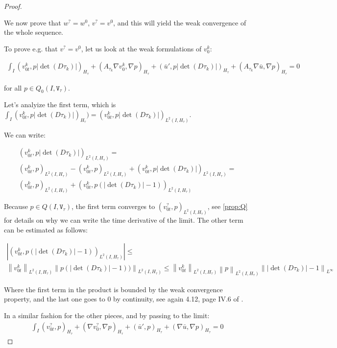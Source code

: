 \documentclass[english,a4paper,9pt,oneside]{scrbook}	%
\theoremstyle{break}
\newenvironment{mproof}[1][\proofname]{%
  \begin{proof}[#1]$ $\par\nobreak\ignorespaces
}{%
  \end{proof}
}
\renewcommand*{\proofname}{Proof}
\theoremstyle{remark}
\newcommand{\norm}[1]{\left\lVert#1\right\rVert}
\newcommand{\tw}[1]{\texttt{#1}}
\begin{document}
\begin{mproof}
We now prove that $w^?=w^0$, $v^?=v^0$, and this will yield the weak convergence of the whole sequence.

To prove e.g. that $v^?=v^0$, let us look at the weak formulations of $v_0^k$:

\begin{align*}
\int_I (v_{0t}^k,p |\det(D\tau_k)|)_{H_\tau} + (A_{\tau_k} \nabla v_0^k, \nabla p)_{H_\tau}+(\bar{u}',p|\det(D\tau_k)|)_{H_\tau}+(A_{\tau_k} \nabla \bar{u} , \nabla p)_{H_\tau} = 0
\end{align*}

for all $p \in Q_0(I,\tw{V}_{\tau})$.

Let's analyize the first term, which is $\int_I (v_{0t}^k,p |\det(D\tau_k)|)_{H_\tau} ) =(v_{0t}^k,p |\det(D\tau_k)|)_{L^2(I,H_\tau)}$.

We can write:

\begin{align*}
(v_{0t}^k,p |\det(D\tau_k)|)_{L^2(I,H_\tau)} =\\ (v_{0t}^k,p )_{L^2(I,H_\tau)}- (v_{0t}^k,p )_{L^2(I,H_\tau)} + (v_{0t}^k,p |\det(D\tau_k)|)_{L^2(I,H_\tau)} =\\ (v_{0t}^k,p )_{L^2(I,H_\tau)} + (v_{0t}^k,p (|\det(D\tau_k)|-1))_{L^2(I,H_\tau)}
\end{align*}

Because $p \in  Q(I,\tw{V}_{\tau})$, the first term converges to $(v_{0t}^?,p )_{L^2(I,H_\tau)}$, see \cref{prop:Q} for details on why we can write the time derivative of the limit. The other term can be estimated as follows:

\begin{align*}
|(v_{0t}^k,p (|\det(D\tau_k)|-1))_{L^2(I,H_\tau)}|\leq\\\norm{v_{0t}^k}_{L^2(I,H_\tau)}\norm{p (|\det(D\tau_k)|-1))}_{L^2(I,H_\tau)}\leq\norm{v_{0t}^k}_{L^2(I,H_\tau)}\norm{p }_{L^2(I,H_\tau)} \norm{|\det(D\tau_k)|-1}_{L^\infty}
\end{align*}

Where the first term in the product is bounded by the weak convergence property, and the last one goes to $0$ by continuity, see again 4.12, page IV.6 of \cite{murat}.

In a similar fashion for the other pieces, and by passing to the limit:
\begin{align*}
\int_I (v_{0t}^?,p)_{H_\tau} + (\nabla v_0^?, \nabla p)_{H_\tau}+(\bar{u}',p)_{H_\tau}+(\nabla \bar{u} , \nabla p)_{H_\tau} = 0
\end{align*}


\end{mproof}
\end{document}
